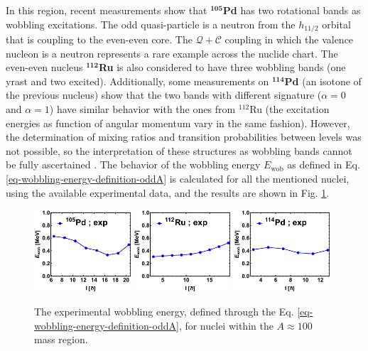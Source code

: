 In this region, recent measurements show that $^\mathbf{105}$\textbf{Pd} \cite{timar2019experimental} has two rotational bands as wobbling excitations. The odd quasi-particle is a neutron from the $h_{11/2}$ orbital that is coupling to the even-even core. The $\mathcal{Q}+\mathscr{C}$ coupling in which the valence nucleon is a neutron represents a rare example across the nuclide chart. The even-even nucleus $^\mathbf{112}$\textbf{Ru} \cite{hamilton2010super} is also considered to have three wobbling bands (one yrast and two excited).
Additionally, some measurements on $^\mathbf{114}$\textbf{Pd} \cite{luo2013triaxial} (an isotone of the previous nucleus) show that the two bands with different signature ($\alpha=0$ and $\alpha=1$) have similar behavior with the ones from $^{112}$Ru (the excitation energies as function of angular momentum vary in the same fashion). However, the determination of mixing ratios and transition probabilities between levels was not possible, so the interpretation of these structures as wobbling bands cannot be fully ascertained \cite{lv2022experimental}. The behavior of the wobbling energy $E_\text{wob}$ as defined in Eq. \ref{eq-wobbling-energy-definition-oddA} is calculated for all the mentioned nuclei, using the available experimental data, and the results are shown in Fig. \ref{wobblers-exp-set1}.
\begin{figure}
    \centering
    \includegraphics[width=0.32\textwidth]{Chapters/Figures/wobblers/105Pd.pdf}
    \includegraphics[width=0.32\textwidth]{Chapters/Figures/wobblers/112Ru.pdf}
    \includegraphics[width=0.32\textwidth]{Chapters/Figures/wobblers/114Pd.pdf}
    \caption{The experimental wobbling energy, defined through the Eq. \ref{eq-wobbling-energy-definition-oddA}, for nuclei within the $A\approx 100$ mass region.}
    \label{wobblers-exp-set1}
\end{figure}

